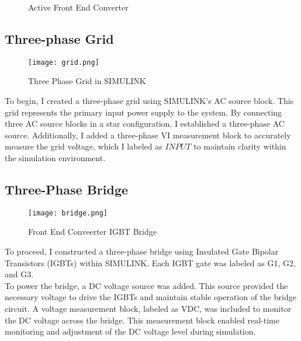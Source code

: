 \begin{figure}[ht]
{
    }
    \caption{Active Front End Converter}
    \label{fig:FEC}
\end{figure}

\subsection{Three-phase Grid}
\begin{figure}[h]
    \centering
    \texttt{[image: grid.png]}
    \caption{Three Phase Grid in SIMULINK}
    \label{fig:Grid}
\end{figure}
To begin, I created a three-phase grid using SIMULINK's AC source block. This
grid represents the primary input power supply to the system. By connecting
three AC source blocks in a star configuration, I established a three-phase AC
source. Additionally, I added a three-phase VI measurement block to accurately
measure the grid voltage, which I labeled as $INPUT$ to maintain clarity within
the simulation environment.

\subsection{Three-Phase Bridge}
\begin{figure}[h]
    \centering
    \texttt{[image: bridge.png]}
    \caption{Front End Conveerter IGBT Bridge}
    \label{fig:Bridge}
\end{figure}
To proceed, I constructed a three-phase bridge using Insulated Gate Bipolar
Transistors (IGBTs) within SIMULINK. Each IGBT gate was labeled as G1, G2, and
G3.\\

To power the bridge, a DC voltage source was added. This source provided the
necessary voltage to drive the IGBTs and maintain stable operation of the
bridge circuit. A voltage measurement block, labeled as VDC, was included to
monitor the DC voltage across the bridge. This measurement block enabled
real-time monitoring and adjustment of the DC voltage level during
simulation.\\

